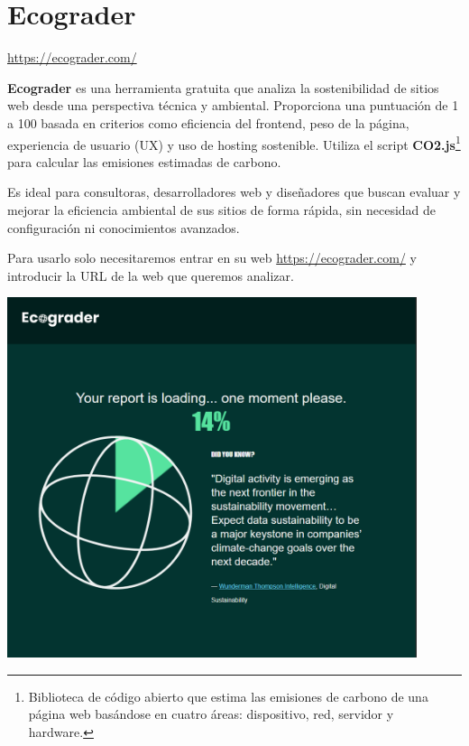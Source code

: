 \documentclass[12pt,a4paper]{report}
\begin{document}
\section*{\textbf{Ecograder}}

\url{https://ecograder.com/}

\textbf{Ecograder} es una herramienta gratuita que analiza la sostenibilidad de sitios web desde una perspectiva técnica y ambiental. Proporciona una puntuación de 1 a 100 basada en criterios como eficiencia del frontend, peso de la página, experiencia de usuario (UX) y uso de hosting sostenible. Utiliza el script \textbf{CO2.js}\footnote{Biblioteca de código abierto que estima las emisiones de carbono de una página web basándose en cuatro áreas: dispositivo, red, servidor y hardware.} para calcular las emisiones estimadas de carbono.

Es ideal para consultoras, desarrolladores web y diseñadores que buscan evaluar
y mejorar la eficiencia ambiental de sus sitios de forma rápida, sin necesidad
de configuración ni conocimientos avanzados.

Para usarlo solo necesitaremos entrar en su web \url{https://ecograder.com/} y
introducir la URL de la web que queremos analizar.

\begin{center}
  \includegraphics[width=0.9\textwidth]{imagenes/Ecograder_1.png}
\end{center}
\end{document}
